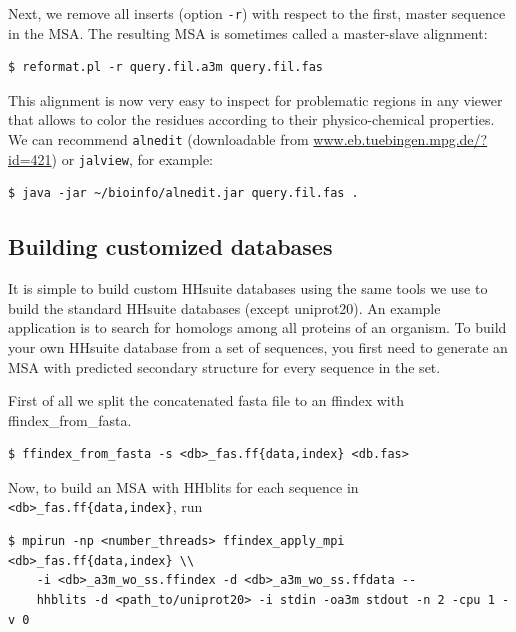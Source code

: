 \documentclass[11pt,a4paper]{article}
\begin{document}
Next, we remove all inserts (option \verb`-r`) with respect to the first, master sequence in the MSA. The resulting MSA is sometimes called a master-slave alignment:
\begin{verbatim}
$ reformat.pl -r query.fil.a3m query.fil.fas
\end{verbatim}

This alignment is now very easy to inspect for problematic regions in any viewer that allows to color the residues according to their physico-chemical properties. We can recommend \verb`alnedit` (downloadable from \url{www.eb.tuebingen.mpg.de/?id=421}) or \verb`jalview`, for example:
\begin{verbatim}
$ java -jar ~/bioinfo/alnedit.jar query.fil.fas .
\end{verbatim}

\subsection{Building customized databases} \label{building_dbs}

It is simple to build custom HHsuite databases using the same tools we use to build the standard HHsuite databases (except uniprot20). An example application is to search for homologs among all proteins of an organism. To build your own HHsuite database from a set of sequences, you first need to generate an MSA with predicted secondary structure for every sequence in the set.

First of all we split the concatenated fasta file to an ffindex with ffindex\_from\_fasta.

\begin{verbatim}
$ ffindex_from_fasta -s <db>_fas.ff{data,index} <db.fas> 
\end{verbatim}

Now, to build an MSA with HHblits for each sequence in \verb`<db>_fas.ff{data,index}`, run\\[-1mm]

\begin{verbatim}
$ mpirun -np <number_threads> ffindex_apply_mpi <db>_fas.ff{data,index} \\
    -i <db>_a3m_wo_ss.ffindex -d <db>_a3m_wo_ss.ffdata -- 
    hhblits -d <path_to/uniprot20> -i stdin -oa3m stdout -n 2 -cpu 1 -v 0
\end{verbatim}
\end{document}
